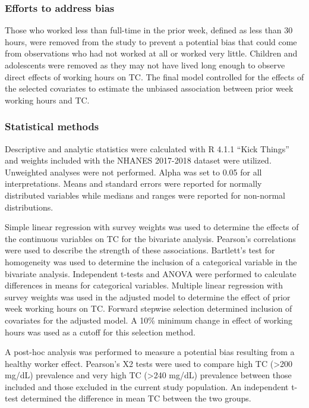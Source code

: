 \documentclass[]{elsarticle} %
\begin{document}
\hypertarget{efforts-to-address-bias}{%
\subsubsection{Efforts to address bias}\label{efforts-to-address-bias}}

Those who worked less than full-time in the prior week, defined as less
than 30 hours, were removed from the study to prevent a potential bias
that could come from observations who had not worked at all or worked
very little. Children and adolescents were removed as they may not have
lived long enough to observe direct effects of working hours on TC. The
final model controlled for the effects of the selected covariates to
estimate the unbiased association between prior week working hours and
TC.

\hypertarget{statistical-methods}{%
\subsubsection{Statistical methods}\label{statistical-methods}}

Descriptive and analytic statistics were calculated with R 4.1.1 ``Kick
Things'' and weights included with the NHANES 2017-2018 dataset were
utilized. Unweighted analyses were not performed. Alpha was set to 0.05
for all interpretations. Means and standard errors were reported for
normally distributed variables while medians and ranges were reported
for non-normal distributions.

Simple linear regression with survey weights was used to determine the
effects of the continuous variables on TC for the bivariate analysis.
Pearson's correlations were used to describe the strength of these
associations. Bartlett's test for homogeneity was used to determine the
inclusion of a categorical variable in the bivariate analysis.
Independent t-tests and ANOVA were performed to calculate differences in
means for categorical variables. Multiple linear regression with survey
weights was used in the adjusted model to determine the effect of prior
week working hours on TC. Forward stepwise selection determined
inclusion of covariates for the adjusted model. A 10\% minimum change in
effect of working hours was used as a cutoff for this selection method.

A post-hoc analysis was performed to measure a potential bias resulting
from a healthy worker effect. Pearson's X2 tests were used to compare
high TC (\textgreater200 mg/dL) prevalence and very high TC
(\textgreater240 mg/dL) prevalence between those included and those
excluded in the current study population. An independent t-test
determined the difference in mean TC between the two groups.
\end{document}
